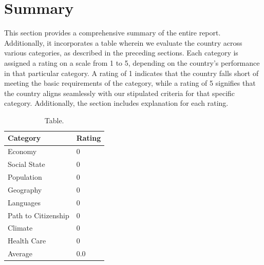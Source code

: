 \section{Summary}
This section provides a comprehensive summary of the entire
report. Additionally, it incorporates a table wherein we
evaluate the country across various categories, as described
in the preceding sections. Each category is assigned a rating
on a scale from 1 to 5, depending on the country's performance
in that particular category. A rating of 1 indicates that the
country falls short of meeting the basic requirements of the
category, while a rating of 5 signifies that the country aligns
seamlessly with our stipulated criteria for that specific
category. Additionally, the section includes explanation 
for each rating.

\begin{table}[!ht] \label{table-summary}
    \centering
    \begin{tabular}{@{}ll@{}}
    \toprule
        \textbf{Category} & \textbf{Rating} \\ 
    \midrule
        Economy & 0 \\ 
        Social State & 0 \\ 
        Population & 0 \\ 
        Geography & 0 \\ 
        Languages & 0 \\ 
        Path to Citizenship & 0 \\ 
        Climate & 0 \\ 
        Health Care & 0 \\ 
    \midrule
        Average & 0.0 \\ 
    \bottomrule
    \end{tabular}
    \caption{Table.}
\end{table}
